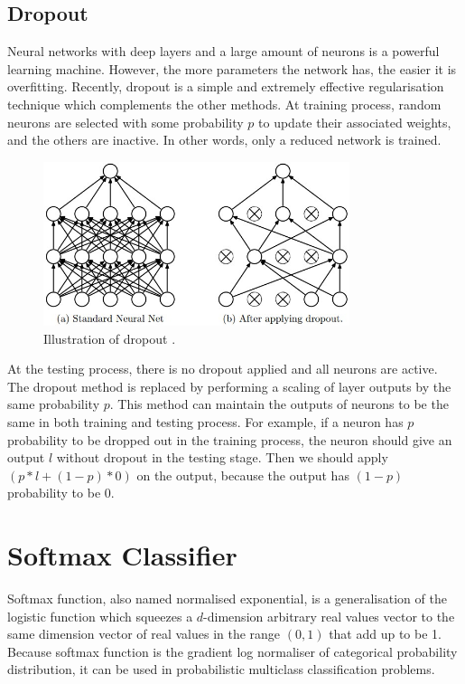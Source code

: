 \subsection{Dropout}

Neural networks with deep layers and a large amount of neurons is a powerful learning machine. However, the more parameters the network has, the easier it is overfitting. Recently, dropout \citep{srivastava2014dropout} is a simple and extremely effective regularisation technique which complements the other methods. At training process, random neurons are selected with some probability $p$ to update their associated weights, and the others are inactive. In other words, only a reduced network is trained.
\graphicspath{ {./Figures/} }
\begin{figure}[!htb]
\centering
\includegraphics[width=0.8\textwidth]{dropout.jpeg}
\caption{\label{fig:Dropout}Illustration of dropout \citep{srivastava2014dropout}.}
\end{figure}
At the testing process, there is no dropout applied and all neurons are active. The dropout method is replaced by performing a scaling of layer outputs by the same probability $p$. This method can maintain the outputs of neurons to be the same in both training and testing process. For example, if a neuron has $p$ probability to be dropped out in the training process, the neuron should give an output $l$ without dropout in the testing stage. Then we should apply $(p\ast l + (1 - p)\ast 0)$ on the output, because the output has $(1-p)$ probability to be $0$.

\section{Softmax Classifier}

Softmax function, also named normalised exponential, is a generalisation of the logistic function which squeezes a $d$-dimension arbitrary real values vector to the same dimension vector of real values in the range $(0,1)$ that add up to be 1. Because softmax function is the gradient log normaliser of categorical probability distribution, it can be used in probabilistic multiclass classification problems.

